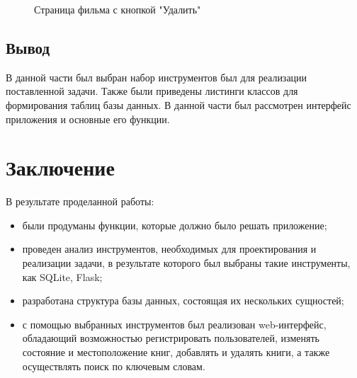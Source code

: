 \documentclass[a4paper, 14pt]{article}
\begin{document}
	\begin{figure}[h!]
		\caption{Страница фильма с кнопкой "Удалить"}
		\label{film2}
	\end{figure}
	\newpage
	
	\subsection{Вывод}
	В данной части был выбран набор инструментов был для реализации поставленной задачи. Также были приведены листинги классов для формирования таблиц базы данных. В данной части был рассмотрен интерфейс приложения и основные его функции.
	
	\newpage
		
	\section*{Заключение}
	
	В результате проделанной работы:
	\begin{itemize}
		\item были продуманы функции, которые должно было решать приложение;
		\item проведен анализ инструментов, необходимых для проектирования и реализации задачи, в результате которого был выбраны такие инструменты, как SQLite, Flask;
		\item разработана структура базы данных, состоящая их нескольких сущностей;
		\item с помощью выбранных инструментов был реализован web-интерфейс, обладающий возможностью регистрировать пользователей, изменять состояние и местоположение книг, добавлять и удалять книги, а также осуществлять поиск по ключевым словам.
	\end{itemize}	
	\newpage
	
\end{document}
